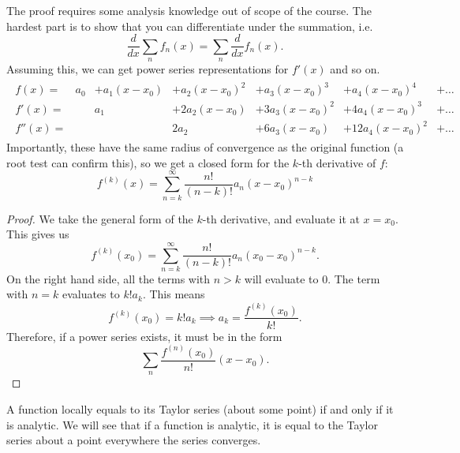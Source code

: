 The proof requires some analysis knowledge out of scope of the course. The hardest part is to show that you can differentiate under the summation, i.e. \[
\frac{d}{dx}\sum_n {f_n(x)} = \sum_n \frac{d}{dx} f_n(x).
\]
Assuming this, we can get power series representations for $f'(x)$ and so on.
\begin{align*}
    \begin{array}{ccccccc}
    f(x) =&  a_0 &+ a_1(x-x_0) &+ a_2(x-x_0)^2 &+a_3(x-x_0)^3&+a_4(x-x_0)^4& +\ldots \\
    f'(x)=&   &a_1 &+ 2a_2(x-x_0) &+ 3a_3(x-x_0)^2 &+4a_4(x-x_0)^3 &+\ldots \\
    f''(x)=& &   &2a_2 &+ 6a_3(x-x_0) &+ 12a_4(x-x_0)^2&+\ldots
    \end{array}
\end{align*}
Importantly, these have the same radius of convergence as the original function (a root test can confirm this), so we get a closed form for the $k$-th derivative of $f$:
\[f^{(k)}(x) = \sum_{n=k}^{\infty} \frac{n!}{(n-k)!}a_n(x-x_0)^{n-k} \] 


\begin{proof}
    We take the general form of the $k$-th derivative, and evaluate it at $x=x_0$.
    This gives us \[
    f^{(k)}(x_0)=\sum_{n=k}^{\infty} \frac{n!}{(n-k)!}a_n(x_0-x_0)^{n-k}.
    \]
    On the right hand side, all the terms with $n>k$ will evaluate to $0$. The term with $n=k$ evaluates to $k!a_k$. This means \[
    f^{(k)}(x_0) = k! a_k \implies a_k = \frac{f^{(k)}(x_0)}{k!}.
    \]
    Therefore, if a power series exists, it must be in the form \[
    \sum_n \frac{f^{(n)}(x_0)}{n!} (x-x_0).
    \]
\end{proof}

A function locally equals to its Taylor series (about some point) if and only if it is analytic. We will see that if a function is analytic, it is equal to the Taylor series about a point everywhere the series converges.


